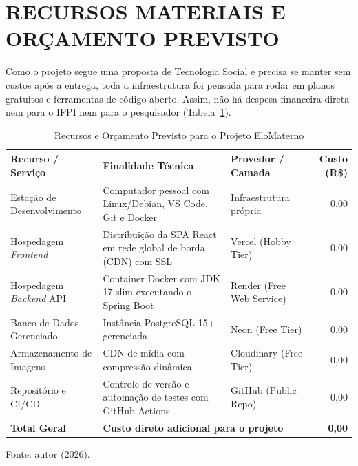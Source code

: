 \section{RECURSOS MATERIAIS E ORÇAMENTO PREVISTO}

Como o projeto segue uma proposta de Tecnologia Social e precisa se manter sem custos após a entrega, toda a infraestrutura foi pensada para rodar em planos gratuitos e ferramentas de código aberto. Assim, não há despesa financeira direta nem para o IFPI nem para o pesquisador (Tabela~\ref{tab:orcamento}).

\begin{table}[H]
    \centering
    \singlespacing
    \caption{Recursos e Orçamento Previsto para o Projeto EloMaterno}
    \label{tab:orcamento}
    \small
    \begin{tabular}{p{3.8cm}p{5.9cm}p{2.8cm}r}
        \toprule
        \textbf{Recurso / Serviço} & \textbf{Finalidade Técnica} & \textbf{Provedor / Camada} & \textbf{Custo (R\$)} \\
        \midrule
        Estação de Desenvolvimento & Computador pessoal com Linux/Debian, VS Code, Git e Docker & Infraestrutura própria & 0,00 \\
        \addlinespace
        Hospedagem \textit{Frontend} & Distribuição da SPA React em rede global de borda (CDN) com SSL & Vercel (Hobby Tier) & 0,00 \\
        \addlinespace
        Hospedagem \textit{Backend} API & Container Docker com JDK 17 slim executando o Spring Boot & Render (Free Web Service) & 0,00 \\
        \addlinespace
        Banco de Dados Gerenciado & Instância PostgreSQL 15+ gerenciada & Neon (Free Tier) & 0,00 \\
        \addlinespace
        Armazenamento de Imagens & CDN de mídia com compressão dinâmica & Cloudinary (Free Tier) & 0,00 \\
        \addlinespace
        Repositório e CI/CD & Controle de versão e automação de testes com GitHub Actions & GitHub (Public Repo) & 0,00 \\
        \midrule
        \textbf{Total Geral} & \multicolumn{2}{l}{\textbf{Custo direto adicional para o projeto}} & \textbf{0,00} \\
        \bottomrule
    \end{tabular}
    \vspace{0.2cm}
    
    {\small Fonte: autor (2026).}
\end{table}